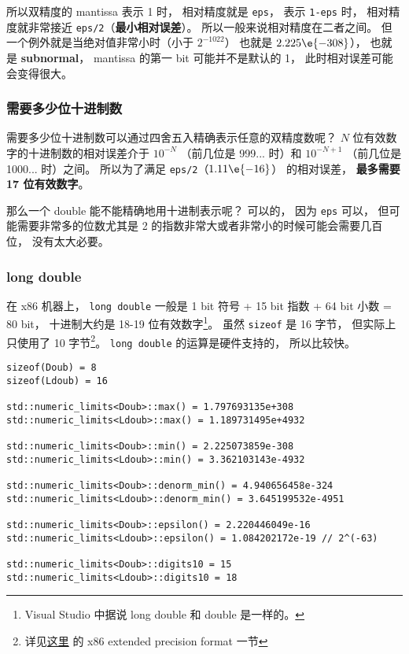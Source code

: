 所以双精度的 mantissa 表示 1 时， 相对精度就是 \verb`eps`， 表示 \verb`1-eps` 时， 相对精度就非常接近 \verb`eps/2`（\textbf{最小相对误差}）。 所以一般来说相对精度在二者之间。 但一个例外就是当绝对值非常小时（小于 $2^{-1022}$） 也就是 $2.225\e{-308}$）， 也就是 \textbf{subnormal}， mantissa 的第一 bit 可能并不是默认的 1， 此时相对误差可能会变得很大。

\subsubsection{需要多少位十进制数}
需要多少位十进制数可以通过四舍五入精确表示任意的双精度数呢？ $N$ 位有效数字的十进制数的相对误差介于 $10^{-N}$ （前几位是 999... 时）和 $10^{-N+1}$ （前几位是 1000... 时）之间。 所以为了满足 \verb`eps/2`（$1.11\e{-16}$） 的相对误差， \textbf{最多需要 17 位有效数字}。

那么一个 double 能不能精确地用十进制表示呢？ 可以的， 因为 \verb`eps` 可以， 但可能需要非常多的位数尤其是 2 的指数非常大或者非常小的时候可能会需要几百位， 没有太大必要。

\subsubsection{long double}
在 x86 机器上， \verb`long double` 一般是 1 bit 符号 + 15 bit 指数 + 64 bit 小数 = 80 bit， 十进制大约是 18-19 位有效数字\footnote{Visual Studio 中据说 long double 和 double 是一样的。}。 虽然 \verb`sizeof` 是 16 字节， 但实际上只使用了 10 字节\footnote{详见\href{https://en.wikipedia.org/wiki/Extended_precision}{这里} 的 x86 extended precision format 一节}。 \verb`long double` 的运算是硬件支持的， 所以比较快。

\begin{lstlisting}[language=none]
sizeof(Doub) = 8
sizeof(Ldoub) = 16

std::numeric_limits<Doub>::max() = 1.797693135e+308
std::numeric_limits<Ldoub>::max() = 1.189731495e+4932

std::numeric_limits<Doub>::min() = 2.225073859e-308
std::numeric_limits<Ldoub>::min() = 3.362103143e-4932

std::numeric_limits<Doub>::denorm_min() = 4.940656458e-324
std::numeric_limits<Ldoub>::denorm_min() = 3.645199532e-4951

std::numeric_limits<Doub>::epsilon() = 2.220446049e-16
std::numeric_limits<Ldoub>::epsilon() = 1.084202172e-19 // 2^(-63)

std::numeric_limits<Doub>::digits10 = 15
std::numeric_limits<Ldoub>::digits10 = 18
\end{lstlisting}

